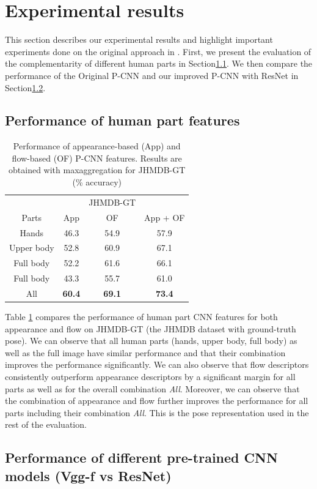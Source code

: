 \documentclass[10pt,twocolumn,letterpaper]{article}
\begin{document}
\section{Experimental results}
\label{results}
This section describes our experimental results and highlight important experiments done on the original approach in \cite{cheron2015p}. First, we present the evaluation of the complementarity of different human parts in Section\ref{diffParts}. We then compare the performance of the Original P-CNN and our improved P-CNN with ResNet in Section\ref{resnetVsvgg}. 

\subsection{Performance of human part features}
\label{diffParts}
\begin{table}
	
	\begin{center}
		\begin{tabular}{cccc}
			\hline
			& & JHMDB-GT\\ [0.5ex] 
			\cline{2-4}
			Parts & App & OF & App + OF \\ [0.5ex]
			\hline
			Hands & 46.3 & 54.9 & 57.9\\
			Upper body  & 52.8 & 60.9 & 67.1\\
			Full body  & 52.2 & 61.6 & 66.1\\
			Full body  & 43.3 & 55.7 & 61.0\\
			All  & \textbf{60.4} & \textbf{69.1} & \textbf{73.4}\\
			\hline
		\end{tabular}
	\end{center}
	\caption{Performance of appearance-based (App) and flow-based (OF) P-CNN features. Results are obtained with maxaggregation for JHMDB-GT (\% accuracy)}
	\label{table:diffparts}
\end{table}

Table \ref{table:diffparts} compares the performance of human part CNN features for both appearance and flow on JHMDB-GT (the JHMDB dataset with ground-truth pose). We can observe that all human parts (hands, upper body, full body) as well as the full image have similar performance and that their combination improves the performance significantly. We can also observe that flow descriptors consistently outperform appearance descriptors by a significant margin for all parts as well as for the overall combination \textit{All}. Moreover, we can observe that the combination of appearance and flow further improves the performance for all parts including their combination \textit{All}. This is the pose representation used in the rest of the evaluation.


\subsection{Performance of different pre-trained CNN models (Vgg-f vs ResNet)}
\label{resnetVsvgg}
{\small


}
\end{document}
